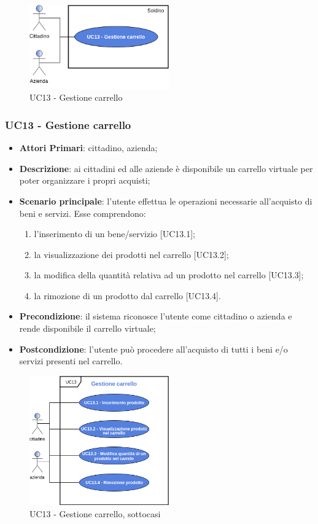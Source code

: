  \begin{figure}[H]
	\includegraphics[width=6cm]{res/images/UC13.png}
	\centering
	\caption{UC13 - Gestione carrello}
\end{figure}
\subsubsection{UC13 - Gestione carrello}

\begin{itemize}
	\item \textbf{Attori Primari}: cittadino, azienda;
	\item \textbf{Descrizione}: ai cittadini ed alle aziende è disponibile un carrello virtuale per poter organizzare i propri acquisti;
	\item \textbf{Scenario principale}: l'utente effettua le operazioni necessarie all'acquisto di beni e servizi. Esse comprendono:
	\begin{enumerate}[label=\alph*.]
		\item l'inserimento di un bene/servizio [UC13.1];
		\item la visualizzazione dei prodotti nel carrello [UC13.2];
		\item la modifica della quantità relativa ad un prodotto nel carrello [UC13.3];
		\item la rimozione di un prodotto dal carrello [UC13.4].
	\end{enumerate}
	\item \textbf{Precondizione}: il sistema riconosce l'utente come cittadino o azienda e rende disponibile il carrello virtuale;
	\item \textbf{Postcondizione}: l'utente può procedere all'acquisto di tutti i beni e/o servizi presenti nel carrello.
\end{itemize} 
 \begin{figure}[h]
	\includegraphics[width=6cm]{res/images/UC13GestioneCarrello.png}
	\centering
	\caption{UC13 - Gestione carrello, sottocasi}
\end{figure}
